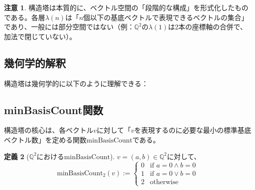 \documentclass[a4paper,11pt]{ltjsarticle}
\theoremstyle{definition}
\newtheorem{definition}{定義}[section]
\newtheorem{remark}[definition]{注意}
\begin{document}
\begin{remark}
構造塔は本質的に、ベクトル空間の「段階的な構成」を形式化したものである。各層$\lambda(n)$は「$n$個以下の基底ベクトルで表現できるベクトルの集合」であり、一般には部分空間ではない（例：$\mathbb{Q}^2$の$\lambda(1)$は2本の座標軸の合併で、加法で閉じていない）。
\end{remark}

\subsection{幾何学的解釈}

構造塔は幾何学的に以下のように理解できる：

\begin{center}
\end{center}

\subsection{minBasisCount関数}

構造塔の核心は、各ベクトル$v$に対して「$v$を表現するのに必要な最小の標準基底ベクトル数」を定める関数$\mathrm{minBasisCount}$である。

\begin{definition}[$\mathbb{Q}^2$における$\mathrm{minBasisCount}$]\label{def:minBasisCount2}
$v = (a, b) \in \mathbb{Q}^2$に対して、
\[
\mathrm{minBasisCount}_2(v) := \begin{cases}
0 & \text{if } a = 0 \land b = 0 \\
1 & \text{if } a = 0 \lor b = 0 \\
2 & \text{otherwise}
\end{cases}
\]
\end{definition}
\end{document}
